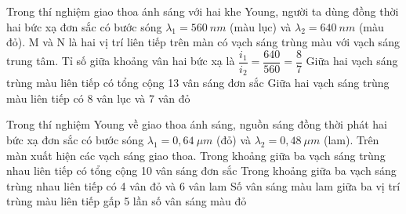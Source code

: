 \begin{ex}
Trong thí nghiệm giao thoa ánh sáng với hai khe Young, người ta dùng đồng thời hai bức xạ đơn sắc có bước sóng $\lambda_1=560\ nm$ (màu lục) và $\lambda_2=640\ nm$ (màu đỏ). M và N là hai vị trí liên tiếp trên màn có vạch sáng trùng màu với vạch sáng trung tâm.
{Tỉ số giữa khoảng vân hai bức xạ là $\dfrac{i_1}{i_2} = \dfrac{640}{560} = \dfrac{8}{7}$}
{\True Giữa hai vạch sáng trùng màu liên tiếp có tổng cộng 13 vân sáng đơn sắc}
{Giữa hai vạch sáng trùng màu liên tiếp có 8 vân lục và 7 vân đỏ}
\end{ex}
\begin{ex}
Trong thí nghiệm Young về giao thoa ánh sáng, nguồn sáng đồng thời phát hai bức xạ đơn sắc có bước sóng $\lambda_1 = 0,64\ \mu m$ (đỏ) và $\lambda_2 = 0,48\ \mu m$ (lam). Trên màn xuất hiện các vạch sáng giao thoa.
{\True Trong khoảng giữa ba vạch sáng trùng nhau liên tiếp có tổng cộng 10 vân sáng đơn sắc}
{\True Trong khoảng giữa ba vạch sáng trùng nhau liên tiếp có 4 vân đỏ và 6 vân lam}
{Số vân sáng màu lam giữa ba vị trí trùng màu liên tiếp gấp 5 lần số vân sáng màu đỏ}
\end{ex}
